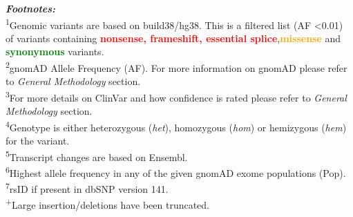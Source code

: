 \textbf{\textit{Footnotes:}}
\\
\textsuperscript{1}Genomic variants are based on build38/hg38. This is a filtered list (AF \textless 0.01) of variants containing \textcolor{red}{\textbf{nonsense, frameshift, essential splice}},\textcolor{Orange}{\textbf{missense}} and \textcolor{Green}{\textbf{synonymous}} variants.
\\
\textsuperscript{2}gnomAD Allele Frequency (AF). For more information on gnomAD please refer to \textit{General Methodology} section.
\\
\textsuperscript{3}For more details on ClinVar and how confidence is rated please refer to \textit{General Methodology} section.
\\
\textsuperscript{4}Genotype is either heterozygous (\textit{het}), homozygous (\textit{hom}) or hemizygous (\textit{hem}) for the variant.
\\
\textsuperscript{5}Transcript changes are based on Ensembl.
\\
\textsuperscript{6}Highest allele frequency in any of the given gnomAD exome populations (Pop).
\\
\textsuperscript{7}rsID if present in dbSNP version 141.
\\
\textsuperscript{+}Large insertion/deletions have been truncated.
\newpage

